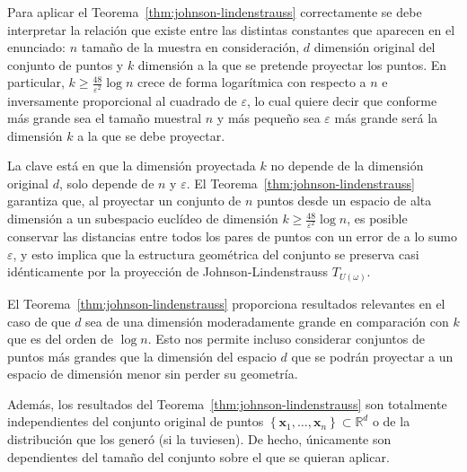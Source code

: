 \begin{remark}
	Para aplicar el Teorema~\ref{thm:johnson-lindenstrauss}
	correctamente se debe interpretar la relación que existe entre las
	distintas constantes que aparecen en el enunciado:
	$n$ tamaño de la muestra en consideración, $d$ dimensión original
	del conjunto de puntos y $k$ dimensión a la que se pretende
	proyectar los puntos.
	En particular, $k\geq\frac{48}{\varepsilon^{2}}\log n$ crece de
	forma logarítmica con respecto a $n$ e inversamente proporcional al
	cuadrado de $\varepsilon$, lo cual quiere decir que conforme más
	grande sea el tamaño muestral $n$ y más pequeño sea $\varepsilon$
	más grande será la dimensión $k$ a la que se debe proyectar.
\end{remark}

\begin{remark}
	La clave está en que la dimensión proyectada $k$ no depende de la
	dimensión original $d$, solo depende de $n$ y $\varepsilon$.
	El Teorema~\ref{thm:johnson-lindenstrauss} garantiza que, al
	proyectar un conjunto de $n$ puntos desde un espacio de alta
	dimensión a un subespacio euclídeo de dimensión
	$k\geq\frac{48}{\varepsilon^{2}}\log n$, es posible conservar las
	distancias entre todos los pares de puntos con un error de a lo
	sumo $\varepsilon$, y esto implica que la estructura geométrica del
	conjunto se preserva casi idénticamente por la proyección de
	Johnson-Lindenstrauss $T_{U\left(\omega\right)}$.
\end{remark}

\begin{remark}
	El Teorema~\ref{thm:johnson-lindenstrauss} proporciona resultados
	relevantes en el caso de que $d$ sea de una dimensión moderadamente
	grande en comparación con $k$ que es del orden de $\log n$.
	Esto nos permite incluso considerar conjuntos de puntos más grandes
	que la dimensión del espacio $d$ que se podrán proyectar a un
	espacio de dimensión menor sin perder su geometría.
\end{remark}

\begin{remark}
	Además, los resultados del Teorema~\ref{thm:johnson-lindenstrauss}
	son totalmente independientes del conjunto original de puntos
	$\left\{\symbf{x}_{1},\dotsc,\symbf{x}_{n}\right\}\subset\mathbb{R}^{d}$
	o de la distribución que los generó (si la tuviesen).
	De hecho, únicamente son dependientes del tamaño del conjunto sobre
	el que se quieran aplicar.
\end{remark}

